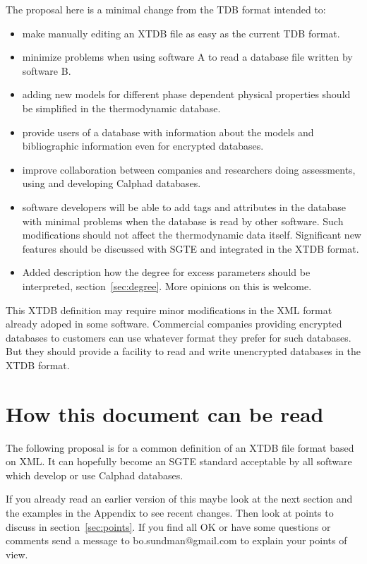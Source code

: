 \documentclass{article}
\begin{document}
The proposal here is a minimal change from the TDB format intended to:
\begin{itemize}
  \item make manually editing an XTDB file as easy as the current TDB
    format.
  \item minimize problems when using software A to read a database
    file written by software B.
  \item adding new models for different phase dependent physical
    properties should be simplified in the thermodynamic database.
  \item provide users of a database with information about the models
    and bibliographic information even for encrypted databases.
  \item improve collaboration between companies and researchers doing
    assessments, using and developing Calphad databases.
  \item software developers will be able to add tags and attributes in
    the database with minimal problems when the database is read by
    other software.  Such modifications should not affect the
    thermodynamic data itself.  Significant new features should be
    discussed with SGTE and integrated in the XTDB format.
  \item Added description how the degree for excess parameters should
    be interpreted, section~\ref{sec:degree}.  More opinions on this is
    welcome.
\end{itemize}

This XTDB definition may require minor modifications in the XML format
already adoped in some software.  Commercial companies providing
encrypted databases to customers can use whatever format they prefer
for such databases.  But they should provide a facility to read and
write unencrypted databases in the XTDB format.

\section{How this document can be read}

The following proposal is for a common definition of an XTDB file
format based on XML.  It can hopefully become an SGTE standard
acceptable by all software which develop or use Calphad databases.

If you already read an earlier version of this maybe look at the next
section and the examples in the Appendix to see recent changes.  Then
look at points to discuss in section~\ref{sec:points}.  If you find
all OK or have some questions or comments send a message to
bo.sundman@gmail.com to explain your points of view.
\end{document}
